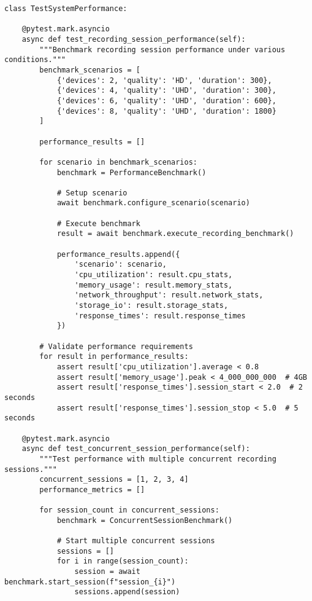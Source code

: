 \documentclass[12pt,a4paper]{article}
\begin{document}
\begin{verbatim}
class TestSystemPerformance:
    
    @pytest.mark.asyncio
    async def test_recording_session_performance(self):
        """Benchmark recording session performance under various conditions."""
        benchmark_scenarios = [
            {'devices': 2, 'quality': 'HD', 'duration': 300},
            {'devices': 4, 'quality': 'UHD', 'duration': 300},
            {'devices': 6, 'quality': 'UHD', 'duration': 600},
            {'devices': 8, 'quality': 'UHD', 'duration': 1800}
        ]
        
        performance_results = []
        
        for scenario in benchmark_scenarios:
            benchmark = PerformanceBenchmark()
            
            # Setup scenario
            await benchmark.configure_scenario(scenario)
            
            # Execute benchmark
            result = await benchmark.execute_recording_benchmark()
            
            performance_results.append({
                'scenario': scenario,
                'cpu_utilization': result.cpu_stats,
                'memory_usage': result.memory_stats,
                'network_throughput': result.network_stats,
                'storage_io': result.storage_stats,
                'response_times': result.response_times
            })
        
        # Validate performance requirements
        for result in performance_results:
            assert result['cpu_utilization'].average < 0.8
            assert result['memory_usage'].peak < 4_000_000_000  # 4GB
            assert result['response_times'].session_start < 2.0  # 2 seconds
            assert result['response_times'].session_stop < 5.0  # 5 seconds
    
    @pytest.mark.asyncio
    async def test_concurrent_session_performance(self):
        """Test performance with multiple concurrent recording sessions."""
        concurrent_sessions = [1, 2, 3, 4]
        performance_metrics = []
        
        for session_count in concurrent_sessions:
            benchmark = ConcurrentSessionBenchmark()
            
            # Start multiple concurrent sessions
            sessions = []
            for i in range(session_count):
                session = await benchmark.start_session(f"session_{i}")
                sessions.append(session)
            

\end{verbatim}
\end{document}
